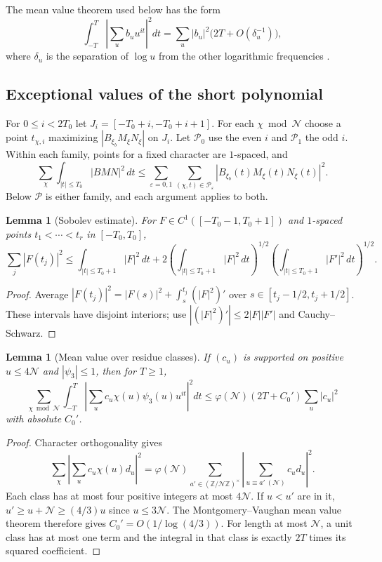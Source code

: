 \documentclass[11pt]{article}
\newtheorem{lemma}[theorem]{Lemma}
\theoremstyle{definition}
\newcommand{\Z}{\mathbb Z}
\newcommand{\ph}{\varphi}
\newcommand{\GN}{\mathcal N}
\theoremstyle{remark}
\numberwithin{equation}{section}
\begin{document}
The mean value theorem used below has the form
\begin{equation}\label{eq:MV-general}
 \int_{-T}^T\left|\sum_u b_u u^{it}\right|^2dt
 =\sum_u|b_u|^2\bigl(2T+O(\delta_u^{-1})\bigr),
\end{equation}
where $\delta_u$ is the separation of $\log u$ from the other
logarithmic frequencies \cite{MV}.

\subsection{Exceptional values of the short polynomial}\label{subsec:LS}
For $0\le i<2T_0$ let $J_i=[-T_0+i,-T_0+i+1]$.
For each $\chi\bmod\GN$ choose a point $t_{\chi,i}$ maximizing
$|B_{\xi_b}M_\xi N_\xi|$ on $J_i$.
Let $\mathcal P_0$ use the even $i$ and $\mathcal P_1$ the odd $i$.
Within each family, points for a fixed character are $1$-spaced, and
\begin{equation}\label{eq:discretize}
 \sum_\chi\int_{|t|\le T_0}|BMN|^2\,dt
 \le\sum_{\varepsilon=0,1}
       \sum_{(\chi,t)\in\mathcal P_\varepsilon}
        |B_{\xi_b}(t)M_\xi(t)N_\xi(t)|^2.
\end{equation}
Below $\mathcal P$ is either family, and each argument applies to both.

\begin{lemma}[Sobolev estimate]\label{lem:Sobolev}
For $F\in C^1([-T_0-1,T_0+1])$ and $1$-spaced points
$t_1<\cdots<t_r$ in $[-T_0,T_0]$,
\begin{equation}\label{eq:Sobolev}
 \sum_j|F(t_j)|^2\le\int_{|t|\le T_0+1}|F|^2\,dt
 +2\left(\int_{|t|\le T_0+1}|F|^2\,dt\right)^{1/2}
   \left(\int_{|t|\le T_0+1}|F'|^2\,dt\right)^{1/2}.
\end{equation}
\end{lemma}
\begin{proof}
Average
$|F(t_j)|^2=|F(s)|^2+\int_s^{t_j}(|F|^2)'$
over $s\in[t_j-1/2,t_j+1/2]$.
These intervals have disjoint interiors; use
$|(|F|^2)'|\le2|F||F'|$ and Cauchy--Schwarz.
\end{proof}

\begin{lemma}[Mean value over residue classes]\label{lem:MV}
If $(c_u)$ is supported on positive $u\le4\GN$ and $|\psi_3|\le1$,
then for $T\ge1$,
\begin{equation}\label{eq:MV}
 \sum_{\chi\bmod\GN}\int_{-T}^T
 \left|\sum_uc_u\chi(u)\psi_3(u)u^{it}\right|^2dt
 \le\ph(\GN)(2T+C_0')\sum_u|c_u|^2
\end{equation}
with absolute $C_0'$.
\end{lemma}
\begin{proof}
Character orthogonality gives
\[
 \sum_\chi\left|\sum_uc_u\chi(u)d_u\right|^2
 =\ph(\GN)\sum_{a'\in(\Z/\GN\Z)^\times}
           \left|\sum_{u\equiv a'\ (\GN)}c_ud_u\right|^2.
\]
Each class has at most four positive integers at most $4\GN$.
If $u<u'$ are in it, $u'\ge u+\GN\ge(4/3)u$ since
$u\le3\GN$. The Montgomery--Vaughan mean value theorem
\cite{MV} therefore gives $C_0'=O(1/\log(4/3))$.
For length at most $\GN$, a unit class has at most one term and the
integral in that class is exactly $2T$ times its squared coefficient.
\end{proof}
\end{document}
